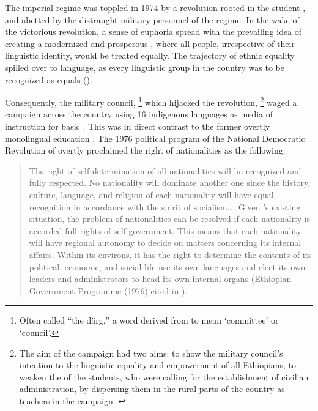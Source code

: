 \documentclass[output=paper,modfonts]{langscibook}
\begin{document}
The imperial regime was toppled in 1974 by a revolution rooted in the student , and abetted by the distraught military personnel of the regime. In the wake of the victorious revolution, a sense of euphoria spread with the prevailing idea of creating a modernized and prosperous , where all people, irrespective of their linguistic identity, would be treated equally. The trajectory of ethnic equality spilled over to language, as every linguistic group in the country was to be recognized as equals (\citealt{Bahru2002,Merera2006,Balsvik2007}).

Consequently, the military council,{} \footnote{Often called “the därg,” a word derived from  to mean ‘committee’ or ‘council’.} which hijacked the revolution,{} \footnote{The aim of the campaign had two aims: to show the military council’s intention to the linguistic equality and empowerment of all Ethiopians, to weaken the  of the students, who were calling for the establishment of civilian administration, by dispersing them in the rural parts of the country as teachers in the  campaign \citep{Balsvik2007}.} waged a  campaign across the country using 16 indigenous languages as media of instruction for basic . This was in direct contrast to the former overtly monolingual education . The 1976 political program of the National Democratic Revolution of  overtly proclaimed the right of nationalities as the following:

\begin{quote}
The right of self-determination of all nationalities will be recognized and fully respected. No nationality will dominate another one since the history, culture, language, and religion of each nationality will have equal recognition in accordance with the spirit of socialism…. Given ’s existing situation, the problem of nationalities can be resolved if each nationality is accorded full rights of self-government. This means that each nationality will have regional autonomy to decide on matters concerning its internal affairs. Within its environs, it has the right to determine the contents of its political, economic, and social life use its own languages and elect its own leaders and administrators to head its own internal organs (Ethiopian Government Programme (1976) cited in \citealt{McNab1990}).
\end{quote}
\end{document}
